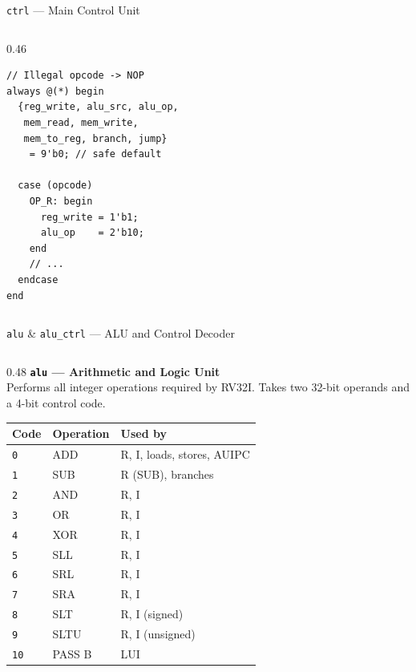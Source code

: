 \documentclass[aspectratio=169,10pt]{beamer}
\begin{document}
\begin{frame}[fragile]{\texttt{ctrl} --- Main Control Unit}
\begin{columns}[T]
\begin{column}{0.46\textwidth}
      \vspace{0.5em}
\begin{lstlisting}
// Illegal opcode -> NOP
always @(*) begin
  {reg_write, alu_src, alu_op,
   mem_read, mem_write,
   mem_to_reg, branch, jump}
    = 9'b0; // safe default

  case (opcode)
    OP_R: begin
      reg_write = 1'b1;
      alu_op    = 2'b10;
    end
    // ...
  endcase
end
\end{lstlisting}
    \end{column}
  \end{columns}
\end{frame}

\begin{frame}[fragile]{\texttt{alu} \& \texttt{alu\_ctrl} --- ALU and Control Decoder}
  \begin{columns}[T]
    \begin{column}{0.48\textwidth}
      \textbf{\texttt{alu} --- Arithmetic and Logic Unit}\\
      Performs all integer operations required by RV32I. Takes two 32-bit operands and a 4-bit control code.

      \vspace{0.4em}
      \renewcommand{\arraystretch}{1.1}
      \scriptsize
      \begin{tabular}{lll}
        \toprule
        Code & Operation & Used by \\
        \midrule
        \texttt{0} & ADD  & R, I, loads, stores, AUIPC \\
        \texttt{1} & SUB  & R (SUB), branches \\
        \texttt{2} & AND  & R, I \\
        \texttt{3} & OR   & R, I \\
        \texttt{4} & XOR  & R, I \\
        \texttt{5} & SLL  & R, I \\
        \texttt{6} & SRL  & R, I \\
        \texttt{7} & SRA  & R, I \\
        \texttt{8} & SLT  & R, I (signed) \\
        \texttt{9} & SLTU & R, I (unsigned) \\
        \texttt{10} & PASS B & LUI \\
        \bottomrule
      \end{tabular}


\end{column}
\end{columns}
\end{frame}
\end{document}
